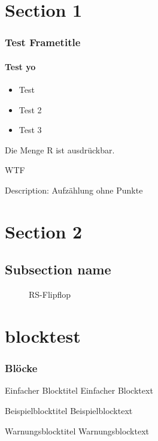 \documentclass[9pt]{beamer}
\begin{document}
\section{Section 1}
\begin{frame}
	\frametitle{Test Frametitle}
	\framesubtitle{Test yo}

    \begin{itemize}
	\item Test
	\item Test 2
	\item Test 3
    \end{itemize}
    \begin{description}
      \item[${G_3}'$:] Die Menge R ist ausdrückbar.
      \item WTF
      \item [Das hier:] Description: Aufzählung ohne Punkte
    \end{description}
\end{frame}



\section{Section 2}
\subsection{Subsection name}
\begin{frame}
    \begin{figure}[!htb]
      \centering
          \caption{RS-Flipflop}%
          \label{fig:rsflipflop}
        \endminipage\hspace{1cm}   
          \caption{}%
          \label{fig:rsflipfloptakt}
        \endminipage
    \end{figure}
\end{frame}

\section{blocktest}
\begin{frame}
	\frametitle{Blöcke}

    \begin{block}{Einfacher Blocktitel}
        Einfacher Blocktext
    \end{block}
    
    \begin{exampleblock}{Beispielblocktitel}
         Beispielblocktext
    \end{exampleblock}
   
    \begin{alertblock}{Warnungsblocktitel}
         Warnungsblocktext
    \end{alertblock}
    
\end{frame}
\end{document}
